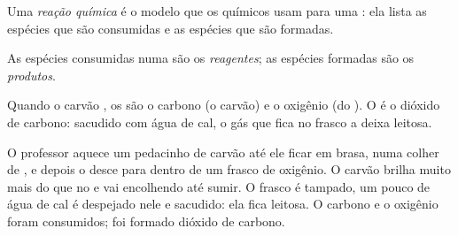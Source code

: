\begin{definition}\label{def:g7:chemical-reactions:reaction}
Uma \emph{reação química} é o modelo que os
químicos usam para uma : ela lista as espécies que
são consumidas e as espécies que são formadas.
\end{definition}

\begin{definition}\label{def:g7:chemical-reactions:reactant}
As espécies consumidas numa  são os
\emph{reagentes}; as espécies formadas são os
\emph{produtos}.
\end{definition}

\begin{example}\label{ex:g7:chemical-reactions:carbon}
Quando o carvão , os  são o carbono (o carvão) e o
oxigênio (do ). O  é o dióxido de carbono: sacudido com água de
cal, o gás que fica no frasco a deixa leitosa.
\end{example}

\begin{inthelab}
O professor aquece um pedacinho de carvão até ele ficar em brasa, numa
colher de , e depois o desce para dentro de um frasco de
oxigênio. O carvão brilha muito mais do que no  e vai encolhendo até
sumir. O frasco é tampado, um pouco de água de cal é despejado nele e
sacudido: ela fica leitosa. O carbono e o oxigênio foram consumidos; foi
formado dióxido de carbono.
\end{inthelab}

